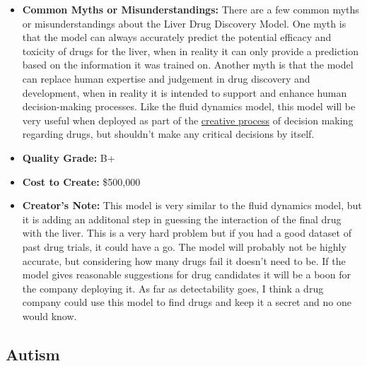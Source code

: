 \begin{itemize}
\begin{itemize}
    \item \textbf{Common Myths or Misunderstandings:} There are a few common myths or misunderstandings about the Liver Drug Discovery Model. One myth is that the model can always accurately predict the potential efficacy and toxicity of drugs for the liver, when in reality it can only provide a prediction based on the information it was trained on.  Another myth is that the model can replace human expertise and judgement in drug discovery and development, when in reality it is intended to support and enhance human decision-making processes. Like the fluid dynamics model, this model will be very useful when deployed as part of the \hyperref[sec:creative]{creative process} of decision making regarding drugs, but shouldn't make any critical decisions by itself. 
    \item \textbf{Quality Grade:} B+
    \item \textbf{Cost to Create:} \$500,000
    \item \textbf{Creator's Note:} This model is very similar to the fluid dynamics model, but it is adding an additonal step in guessing the interaction of the final drug with the liver. This is a very hard problem but if you had a good dataset of past drug trials, it could have a go. The model will probably not be highly accurate, but considering how many drugs fail it doesn't need to be. If the model gives reasonable suggestions for drug candidates it will be a boon for the company deploying it. As far as detectability goes, I think a drug company could use this model to find drugs and keep it a secret and no one would know.
\end{itemize}

\subsection{Autism}


\end{itemize}
